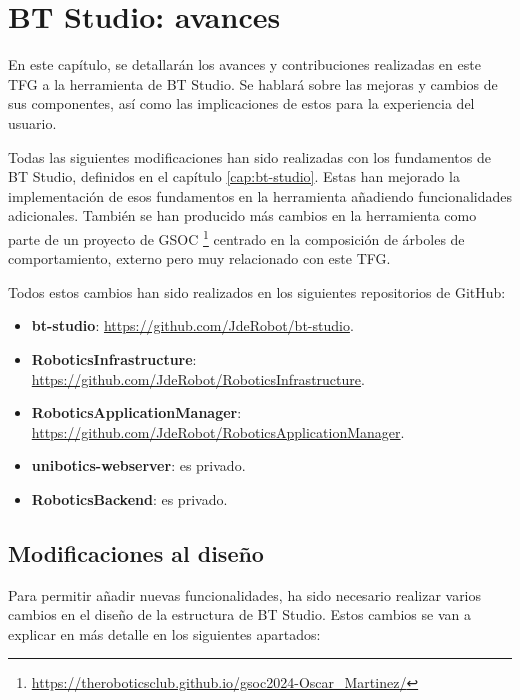 \chapter{BT Studio: avances}\label{cap:bt-studio-avances}

En este capítulo, se detallarán los avances y contribuciones realizadas en este TFG a la herramienta de BT Studio. Se hablará sobre las mejoras y cambios de sus componentes, así como las implicaciones de estos para la experiencia del usuario.

Todas las siguientes modificaciones han sido realizadas con los fundamentos de BT Studio, definidos en el capítulo \ref{cap:bt-studio}. Estas han mejorado la implementación de esos fundamentos en la herramienta añadiendo funcionalidades adicionales. También se han producido más cambios en la herramienta como parte de un proyecto de GSOC \footnote{\url{https://theroboticsclub.github.io/gsoc2024-Oscar_Martinez/}} centrado en la composición de árboles de comportamiento, externo pero muy relacionado con este TFG.

Todos estos cambios han sido realizados en los siguientes repositorios de GitHub:

\begin{itemize}
    \item \textbf{bt-studio}: \url{https://github.com/JdeRobot/bt-studio}.
    \item \textbf{RoboticsInfrastructure}: \url{https://github.com/JdeRobot/RoboticsInfrastructure}.
    \item \textbf{RoboticsApplicationManager}: \url{https://github.com/JdeRobot/RoboticsApplicationManager}.
    \item \textbf{unibotics-webserver}: es privado.
    \item \textbf{RoboticsBackend}: es privado.
\end{itemize}

\section{Modificaciones al diseño}\label{sec:mod-design}

Para permitir añadir nuevas funcionalidades, ha sido necesario realizar varios cambios en el diseño de la estructura de BT Studio. Estos cambios se van a explicar en más detalle en los siguientes apartados:

